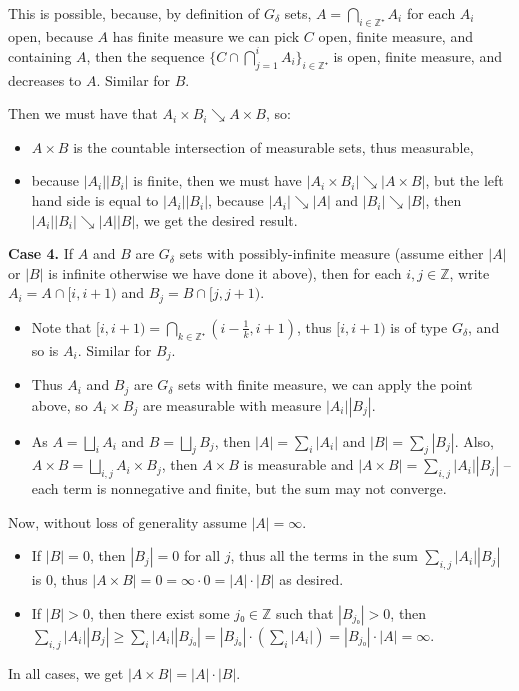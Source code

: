 \documentclass{article}
\begin{document}
This is possible, because, by definition of $G_δ$ sets, $A=⋂_{i ∈ ℤ⁺} A_i$ for each $A_i$ open, because $A$ has finite measure we can pick $C$ open, finite measure, and containing $A$, then the sequence $\{ C ∩ ⋂_{j=1}^i A_i \}_{i ∈ ℤ⁺}$ is open, finite measure, and decreases to $A$. Similar for $B$.

Then we must have that $A_i × B_i ↘ A × B$, so:
\begin{itemize}
    \item $A × B$ is the countable intersection of measurable sets, thus measurable,
    \item because $|A_i||B_i|$ is finite, then we must have $|A_i × B_i|↘|A × B|$, but the left hand side is equal to $|A_i||B_i|$, because $|A_i|↘|A|$ and $|B_i|↘|B|$, then $|A_i||B_i|↘|A||B|$, we get the desired result.
\end{itemize}

\textbf{Case 4.} If $A$ and $B$ are $G_δ$ sets with possibly-infinite measure (assume either $|A|$ or $|B|$ is infinite otherwise we have done it above), then for each $i, j ∈ ℤ$, write $A_i=A ∩[i, i+1)$ and $B_j=B ∩[j, j+1)$.
\begin{itemize}
    \item Note that $[i, i+1)=⋂_{k ∈ ℤ⁺} (i-\frac{1}{k}, i+1)$, thus $[i, i+1)$ is of type $G_δ$, and so is $A_i$. Similar for $B_j$.
    \item Thus $A_i$ and $B_j$ are $G_δ$ sets with finite measure, we can apply the point above, so $A_i × B_j$ are measurable with measure $|A_i||B_j|$.
    \item As $A=⨆_i A_i$ and $B=⨆_j B_j$, then $|A|=∑_i |A_i|$ and $|B|=∑_j |B_j|$. Also, $A × B = ⨆_{i, j} A_i × B_j$, then $A × B$ is measurable and $|A × B|=∑_{i, j} |A_i||B_j|$ -- each term is nonnegative and finite, but the sum may not converge.
\end{itemize}

Now, without loss of generality assume $|A|=∞$.
\begin{itemize}
    \item If $|B|=0$, then $|B_j|=0$ for all $j$, thus all the terms in the sum $∑_{i, j} |A_i||B_j|$ is $0$, thus $|A × B|=0=∞ ⋅ 0=|A|⋅|B|$ as desired.
    \item If $|B|>0$, then there exist some $j₀∈ ℤ$ such that $|B_{j₀}|>0$, then $∑_{i, j} |A_i||B_j| ≥ ∑_i |A_i| |B_{j₀}| = |B_{j₀}| ⋅ (∑_i |A_i|) = |B_{j₀}| ⋅ |A| = ∞$.
\end{itemize}
In all cases, we get $|A × B|=|A|⋅|B|$.
\end{document}
